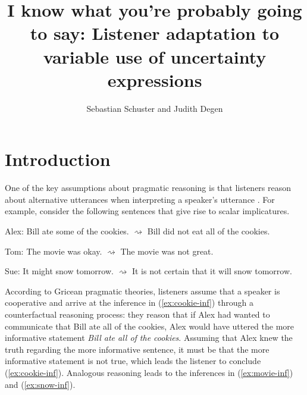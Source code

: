 \documentclass[man, floatsintext]{apa6}
\title{I know what you're probably going to say:  Listener adaptation to variable use of uncertainty expressions}
\author{Sebastian Schuster and Judith Degen}
\affiliation{Department of Linguistics, Stanford University}
\begin{document}
\maketitle

\setcounter{secnumdepth}{3}


\section{Introduction}


One of the key assumptions about pragmatic reasoning is that listeners reason about alternative utterances when interpreting a speaker's utterance \parencite{Grice1975, Horn1984}. For example, consider the following sentences that give rise to scalar implicatures.

\begin{exe}
  \ex 
  \begin{xlist}
    \ex Alex: Bill ate some of the cookies.
    \ex \label{ex:cookie-inf} $\rightsquigarrow$ Bill did not eat all of the cookies.
  \end{xlist}
  \ex 
  \begin{xlist} 
    \ex Tom: The movie was okay.
    \ex \label{ex:movie-inf} $\rightsquigarrow$  The movie was not great.
  \end{xlist}
  \ex 
  \begin{xlist} 
    \ex Sue: It might snow tomorrow.
    \ex \label{ex:snow-inf} $\rightsquigarrow$  It is not certain that it will snow tomorrow.
  \end{xlist}
\end{exe}
According to Gricean pragmatic theories, listeners assume that a speaker is cooperative and arrive at the inference in (\ref{ex:cookie-inf}) through a counterfactual reasoning process: they reason that if Alex had wanted to communicate that Bill ate all of the cookies, Alex would have uttered the more informative statement \textit{Bill ate all of the cookies}. Assuming that Alex knew the truth regarding the more informative sentence, it must be that the more informative statement is not true, which leads the listener to conclude (\ref{ex:cookie-inf}). Analogous reasoning leads to the inferences in (\ref{ex:movie-inf})  and (\ref{ex:snow-inf}).
\end{document}
